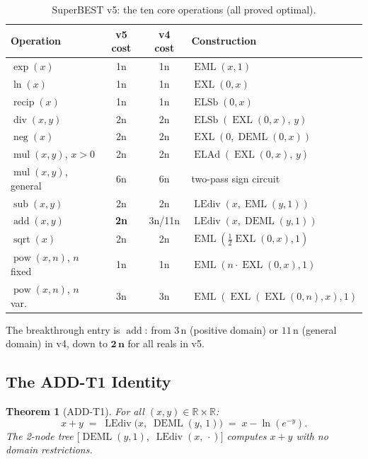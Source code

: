 \documentclass[12pt,a4paper]{article}
\newtheorem{theorem}{Theorem}[section]
\theoremstyle{definition}
\newcommand{\EML}{\operatorname{EML}}
\newcommand{\EXL}{\operatorname{EXL}}
\newcommand{\DEML}{\operatorname{DEML}}
\newcommand{\ELAd}{\operatorname{ELAd}}
\newcommand{\ELSb}{\operatorname{ELSb}}
\newcommand{\LEdiv}{\operatorname{LEdiv}}
\newcommand{\recip}{\operatorname{recip}}
\newcommand{\divop}{\operatorname{div}}
\newcommand{\mulop}{\operatorname{mul}}
\newcommand{\subop}{\operatorname{sub}}
\newcommand{\addop}{\operatorname{add}}
\newcommand{\negop}{\operatorname{neg}}
\newcommand{\powop}{\operatorname{pow}}
\newcommand{\sqrtop}{\operatorname{sqrt}}
\newcommand{\R}{\mathbb{R}}
\begin{document}
\begin{table}[h]
\centering
\caption{SuperBEST v5: the ten core operations (all proved optimal).}
\label{tab:v5}
\smallskip
\begin{tabular}{@{}lccl@{}}
\toprule
\textbf{Operation} & \textbf{v5 cost} & \textbf{v4 cost} & \textbf{Construction} \\
\midrule
$\exp(x)$               & 1n & 1n  & $\EML(x,1)$ \\
$\ln(x)$                & 1n & 1n  & $\EXL(0,x)$ \\
$\recip(x)$             & 1n & 1n  & $\ELSb(0,x)$ \\
$\divop(x,y)$           & 2n & 2n  & $\ELSb(\EXL(0,x),\,y)$ \\
$\negop(x)$             & 2n & 2n  & $\EXL(0,\DEML(0,x))$ \\
$\mulop(x,y)$, $x>0$    & 2n & 2n  & $\ELAd(\EXL(0,x),\,y)$ \\
$\mulop(x,y)$, general  & 6n & 6n  & two-pass sign circuit \\
$\subop(x,y)$           & 2n & 2n  & $\LEdiv(x,\EML(y,1))$ \\
$\addop(x,y)$           & \textbf{2n} & 3n/11n & $\LEdiv(x,\DEML(y,1))$ \\
$\sqrtop(x)$            & 2n & 2n  & $\EML(\tfrac{1}{2}\EXL(0,x),1)$ \\
$\powop(x,n)$, $n$ fixed& 1n & 1n  & $\EML(n\cdot\EXL(0,x),1)$ \\
$\powop(x,n)$, $n$ var. & 3n & 3n  & $\EML(\EXL(\EXL(0,n),x),1)$ \\
\bottomrule
\end{tabular}
\end{table}

\noindent
The breakthrough entry is $\addop$: from $3\,\text{n}$ (positive domain) or
$11\,\text{n}$ (general domain) in v4, down to $\mathbf{2\,\text{n}}$ for all reals in v5.

\subsection{The ADD-T1 Identity}

\begin{theorem}[ADD-T1]
\label{thm:add_t1}
For all $(x, y) \in \R \times \R$:
\[
  x + y \;=\; \LEdiv\!\bigl(x,\;\DEML(y,\,1)\bigr)
           \;=\; x - \ln(e^{-y}).
\]
The 2-node tree $\bigl[\DEML(y,1),\; \LEdiv(x,\,\cdot)\bigr]$ computes $x+y$
with no domain restrictions.
\end{theorem}
\end{document}
